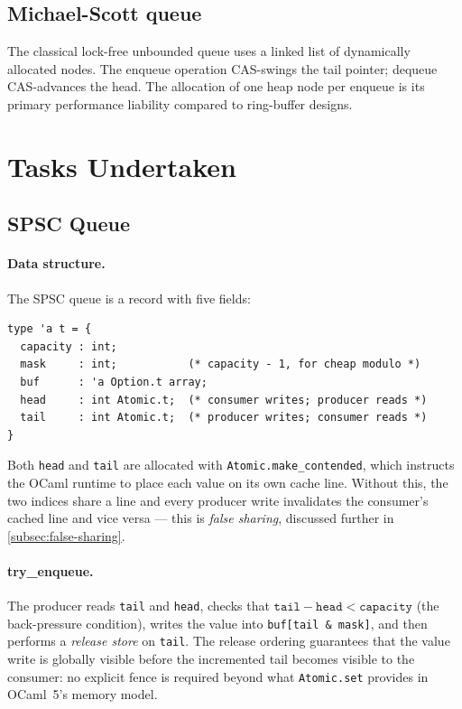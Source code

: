 \documentclass[11pt,a4paper]{article}
\begin{document}
\subsection{Michael-Scott queue~\cite{ms96}}

The classical lock-free unbounded queue uses a linked list of dynamically allocated nodes.
The enqueue operation CAS-swings the tail pointer; dequeue CAS-advances the head. The
allocation of one heap node per enqueue is its primary performance liability compared to
ring-buffer designs.

\section{Tasks Undertaken}
\label{sec:tasks}

\subsection{SPSC Queue }
\label{subsec:spsc}

\paragraph{Data structure.}
The SPSC queue is a record with five fields:

\begin{lstlisting}[caption={Core SPSC record type.}]
type 'a t = {
  capacity : int;
  mask     : int;           (* capacity - 1, for cheap modulo *)
  buf      : 'a Option.t array;
  head     : int Atomic.t;  (* consumer writes; producer reads *)
  tail     : int Atomic.t;  (* producer writes; consumer reads *)
}
\end{lstlisting}

Both \texttt{head} and \texttt{tail} are allocated with
\texttt{Atomic.make\_contended}, which instructs the OCaml runtime to place
each value on its own cache line.  Without this, the two indices share a line
and every producer write invalidates the consumer's cached line and vice versa
--- this is \emph{false sharing}, discussed further in \cref{subsec:false-sharing}.

\paragraph{try\_enqueue.}
The producer reads \texttt{tail} and \texttt{head}, checks that
$\texttt{tail} - \texttt{head} < \texttt{capacity}$ (the back-pressure condition),
writes the value into \texttt{buf[tail \& mask]}, and then performs a
\emph{release store} on \texttt{tail}. The release ordering guarantees that the
value write is globally visible before the incremented tail becomes visible
to the consumer: no explicit fence is required beyond what \texttt{Atomic.set}
provides in OCaml~5's memory model.
\end{document}
